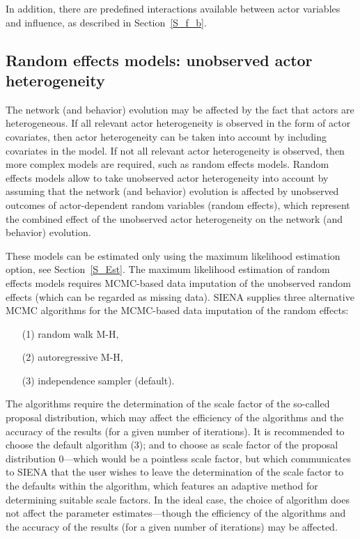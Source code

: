 \documentclass[a4paper,fleqn,11pt]{article}
\newcommand{\+}{\, + \,}
\newcommand{\SI}{{\sf SIENA }}
\begin{document}
In addition, there are predefined interactions available
between actor variables and influence, as described in Section~\ref{S_f_b}.

\iffalse
\subsection{Random effects models: unobserved actor heterogeneity}

The network (and behavior) evolution may be affected
by the fact that actors are heterogeneous.
If all relevant actor heterogeneity is observed in the form of actor
covariates,
then actor heterogeneity can be taken into account by including
covariates in the model.
If not all relevant actor heterogeneity is observed,
then more complex models are required, such as random effects models.
Random effects models \citep[see][]{SchweinbergerSnijders07b} allow to take
unobserved actor heterogeneity into account
by assuming that the network (and behavior) evolution is affected
by unobserved
outcomes of actor-dependent random variables (random effects),
which represent the combined effect of the unobserved actor
heterogeneity on the network (and behavior) evolution.

These models can be estimated only using the maximum likelihood
estimation option, see Section~\ref{S_Est}.
The maximum likelihood estimation of random effects models requires
MCMC-based data
imputation of the unobserved random effects (which can be regarded
as missing data).
\SI supplies three alternative MCMC algorithms for the MCMC-based
data imputation of the random effects:
\begin{itemize}
\item[(1)] random walk M-H,
\item[(2)] autoregressive M-H,
\item[(3)] independence sampler (default).
\end{itemize}
The algorithms require the determination of the scale factor of
the so-called proposal distribution,
which may affect the efficiency of the algorithms and
the accuracy of the results (for a given number of iterations).
It is recommended to choose the default algorithm (3);
and to choose as scale factor of the proposal distribution $0$---which
would be a pointless scale factor, but which communicates to \SI
that the user wishes to leave the determination of the scale factor to
the defaults within the algorithm,
which features an adaptive method for determining suitable scale factors.
In the ideal case, the choice of algorithm does not affect the
parameter estimates---though the efficiency of
the algorithms and the accuracy of the results
(for a given number of iterations) may be affected.
\end{document}
